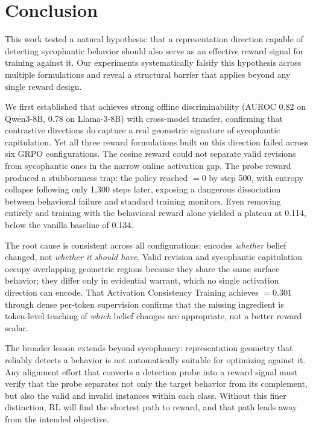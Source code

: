 \section{Conclusion}\label{sec:conclusion}

This work tested a natural hypothesis: that a representation direction capable of detecting sycophantic behavior should also serve as an effective reward signal for training against it. Our experiments systematically falsify this hypothesis across multiple formulations and reveal a structural barrier that applies beyond any single reward design.

We first established that \dsyc{} achieves strong offline discriminability (AUROC 0.82 on Qwen3-8B, 0.78 on Llama-3-8B) with cross-model transfer, confirming that contrastive directions do capture a real geometric signature of sycophantic capitulation. Yet all three reward formulations built on this direction failed across six GRPO configurations. The cosine reward could not separate valid revisions from sycophantic ones in the narrow online activation gap. The probe reward produced a stubbornness trap: the policy reached \tof{}$= 0$ by step 500, with entropy collapse following only 1{,}300 steps later, exposing a dangerous dissociation between behavioral failure and standard training monitors. Even removing \dsyc{} entirely and training with the behavioral \rthree{} reward alone yielded a \sycon{} plateau at 0.114, below the vanilla baseline of 0.134.

The root cause is consistent across all configurations: \dsyc{} encodes \emph{whether} belief changed, not \emph{whether it should have}. Valid revision and sycophantic capitulation occupy overlapping geometric regions because they share the same surface behavior; they differ only in evidential warrant, which no single activation direction can encode. That Activation Consistency Training achieves \sycon{}$= 0.301$ through dense per-token supervision confirms that the missing ingredient is token-level teaching of \emph{which} belief changes are appropriate, not a better reward scalar.

The broader lesson extends beyond sycophancy: representation geometry that reliably detects a behavior is not automatically suitable for optimizing against it. Any alignment effort that converts a detection probe into a reward signal must verify that the probe separates not only the target behavior from its complement, but also the valid and invalid instances within each class. Without this finer distinction, RL will find the shortest path to reward, and that path leads away from the intended objective.
